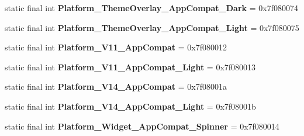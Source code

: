 \begin{DoxyCompactItemize}
\item 
\hypertarget{classandroid_1_1support_1_1v7_1_1appcompat_1_1_r_1_1style_ad5eb2d3e6c0cba3c609b9381e2ac06bd}{}static final int {\bfseries Platform\+\_\+\+Theme\+Overlay\+\_\+\+App\+Compat\+\_\+\+Dark} = 0x7f080074\label{classandroid_1_1support_1_1v7_1_1appcompat_1_1_r_1_1style_ad5eb2d3e6c0cba3c609b9381e2ac06bd}

\item 
\hypertarget{classandroid_1_1support_1_1v7_1_1appcompat_1_1_r_1_1style_abb38710dc94d78d16e3fa6ccdf5cffd2}{}static final int {\bfseries Platform\+\_\+\+Theme\+Overlay\+\_\+\+App\+Compat\+\_\+\+Light} = 0x7f080075\label{classandroid_1_1support_1_1v7_1_1appcompat_1_1_r_1_1style_abb38710dc94d78d16e3fa6ccdf5cffd2}

\item 
\hypertarget{classandroid_1_1support_1_1v7_1_1appcompat_1_1_r_1_1style_a17a08ee3162e9faa58e649059b4450f7}{}static final int {\bfseries Platform\+\_\+\+V11\+\_\+\+App\+Compat} = 0x7f080012\label{classandroid_1_1support_1_1v7_1_1appcompat_1_1_r_1_1style_a17a08ee3162e9faa58e649059b4450f7}

\item 
\hypertarget{classandroid_1_1support_1_1v7_1_1appcompat_1_1_r_1_1style_a3c79540d08a593db0383a9495add07be}{}static final int {\bfseries Platform\+\_\+\+V11\+\_\+\+App\+Compat\+\_\+\+Light} = 0x7f080013\label{classandroid_1_1support_1_1v7_1_1appcompat_1_1_r_1_1style_a3c79540d08a593db0383a9495add07be}

\item 
\hypertarget{classandroid_1_1support_1_1v7_1_1appcompat_1_1_r_1_1style_acec409d7e0da5725a0c1304ea98203d9}{}static final int {\bfseries Platform\+\_\+\+V14\+\_\+\+App\+Compat} = 0x7f08001a\label{classandroid_1_1support_1_1v7_1_1appcompat_1_1_r_1_1style_acec409d7e0da5725a0c1304ea98203d9}

\item 
\hypertarget{classandroid_1_1support_1_1v7_1_1appcompat_1_1_r_1_1style_aa6d2e907602870913732bb0e8bd831e6}{}static final int {\bfseries Platform\+\_\+\+V14\+\_\+\+App\+Compat\+\_\+\+Light} = 0x7f08001b\label{classandroid_1_1support_1_1v7_1_1appcompat_1_1_r_1_1style_aa6d2e907602870913732bb0e8bd831e6}

\item 
\hypertarget{classandroid_1_1support_1_1v7_1_1appcompat_1_1_r_1_1style_a90ab46cdb3f297b8f5078a63d4c05b7f}{}static final int {\bfseries Platform\+\_\+\+Widget\+\_\+\+App\+Compat\+\_\+\+Spinner} = 0x7f080014\label{classandroid_1_1support_1_1v7_1_1appcompat_1_1_r_1_1style_a90ab46cdb3f297b8f5078a63d4c05b7f}


\end{DoxyCompactItemize}
